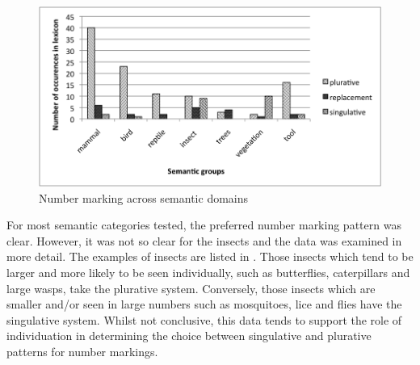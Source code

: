 \documentclass[output=paper]{langsci/langscibook}
\begin{document}
\begin{figure}
\includegraphics[width=\textwidth]{figures/moodie-fig-1.png}
\caption{Number marking across semantic domains}
\label{fig:moodie:1}
\end{figure}
For most semantic categories tested, the preferred number marking pattern was clear. However, it was not so clear for the insects and the data was examined in more detail. The examples of insects are listed in . Those insects which tend to be larger and more likely to be seen individually, such as butterflies, caterpillars and large wasps, take the plurative system. Conversely, those insects which are smaller and/or seen in large numbers such as mosquitoes, lice and flies have the singulative system. Whilst not conclusive, this data tends to support the role of individuation in determining the choice between singulative and plurative patterns for number markings.
\end{document}
